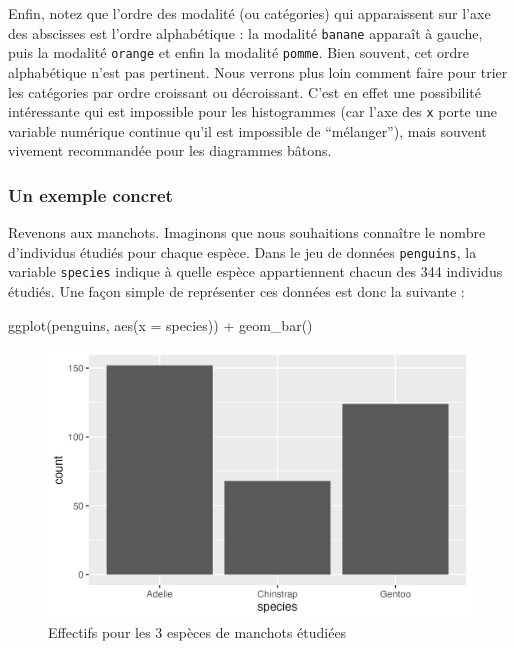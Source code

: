 \documentclass[
  letterpaper,
  DIV=11,
  numbers=noendperiod]{scrreprt}
\newenvironment{Shaded}{\begin{snugshade}}{\end{snugshade}}
\newcommand{\AttributeTok}[1]{\textcolor[rgb]{0.40,0.45,0.13}{#1}}
\newcommand{\FunctionTok}[1]{\textcolor[rgb]{0.28,0.35,0.67}{#1}}
\newcommand{\NormalTok}[1]{\textcolor[rgb]{0.00,0.23,0.31}{#1}}
\newcommand{\SpecialCharTok}[1]{\textcolor[rgb]{0.37,0.37,0.37}{#1}}
\begin{document}
Enfin, notez que l'ordre des modalité (ou catégories) qui apparaissent
sur l'axe des abscisses est l'ordre alphabétique : la modalité
\texttt{banane} apparaît à gauche, puis la modalité \texttt{orange} et
enfin la modalité \texttt{pomme}. Bien souvent, cet ordre alphabétique
n'est pas pertinent. Nous verrons plus loin comment faire pour trier les
catégories par ordre croissant ou décroissant. C'est en effet une
possibilité intéressante qui est impossible pour les histogrammes (car
l'axe des \texttt{x} porte une variable numérique continue qu'il est
impossible de ``mélanger''), mais souvent vivement recommandée pour les
diagrammes bâtons.

\hypertarget{un-exemple-concret}{%
\subsubsection{Un exemple concret}\label{un-exemple-concret}}

Revenons aux manchots. Imaginons que nous souhaitions connaître le
nombre d'individus étudiés pour chaque espèce. Dans le jeu de données
\texttt{penguins}, la variable \texttt{species} indique à quelle espèce
appartiennent chacun des 344 individus étudiés. Une façon simple de
représenter ces données est donc la suivante :

\begin{Shaded}
\begin{Highlighting}[]
\FunctionTok{ggplot}\NormalTok{(penguins, }\FunctionTok{aes}\NormalTok{(}\AttributeTok{x =}\NormalTok{ species)) }\SpecialCharTok{+}
  \FunctionTok{geom\_bar}\NormalTok{()}
\end{Highlighting}
\end{Shaded}

\begin{figure}[H]

{\centering \includegraphics{./03-visualization_files/figure-pdf/fig-bpspecies-1.png}

}

\caption{\label{fig-bpspecies}Effectifs pour les 3 espèces de manchots
étudiées}

\end{figure}
\end{document}

